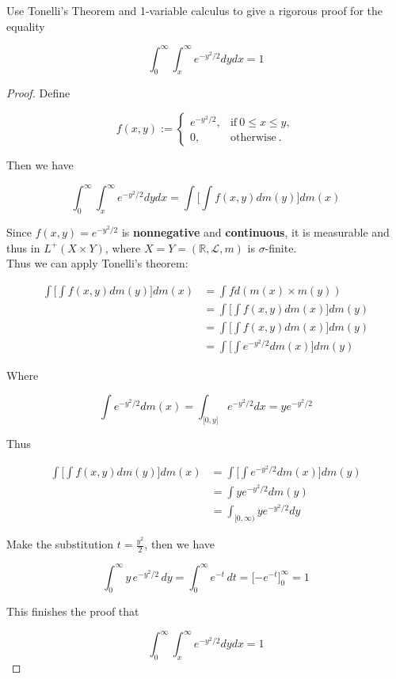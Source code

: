 \documentclass{qlnotes-export}
\begin{document}
Use Tonelli's Theorem and 1-variable calculus to give a rigorous proof for the equality

\[\int_{0}^{\infty}\int_{x}^{\infty}e^{- y^{2}/2} dy dx = 1\]

\begin{proof}

Define

\[f(x,y) := \left\{ \begin{matrix}
{e^{- y^{2}/2},} & {\text{if}\ 0 \leq x \leq y,} \\
{0,} & {\text{otherwise}\ .}
\end{matrix} \right.\]

Then we have

\[\int_{0}^{\infty}\int_{x}^{\infty}e^{- y^{2}/2} dy dx = \int\lbrack\int f(x,y) dm(y)\rbrack dm(x)\]

Since \(f(x,y) = e^{- y^{2}/2}\) is \textbf{nonnegative} and \textbf{continuous}, it is measurable and thus in \(L^{+}(X \times Y)\), where \(X = Y = ({\mathbb{R}},\mathcal{L},m)\) is \(\sigma\)-finite.\\
Thus we can apply Tonelli's theorem:

\[\begin{matrix}
{\int\lbrack\int f(x,y) dm(y)\rbrack dm(x)} & {= \int f d(m(x) \times m(y))} \\
 & {= \int\lbrack\int f(x,y) dm(x)\rbrack dm(y)} \\
 & {= \int\lbrack\int f(x,y) dm(x)\rbrack dm(y)} \\
 & {= \int\lbrack\int e^{- y^{2}/2} dm(x)\rbrack dm(y)}
\end{matrix}\]

Where

\[\int e^{- y^{2}/2} dm(x) = \int_{\lbrack 0,y\rbrack}e^{- y^{2}/2} dx = ye^{- y^{2}/2}\]

Thus

\[\begin{matrix}
{\int\lbrack\int f(x,y) dm(y)\rbrack dm(x)} & {= \int\lbrack\int e^{- y^{2}/2} dm(x)\rbrack dm(y)} \\
 & {= \int ye^{- y^{2}/2} dm(y)} \\
 & {= \int_{\lbrack 0,\infty)}ye^{- y^{2}/2} dy}
\end{matrix}\]

Make the substitution \(t = \frac{y^{2}}{2}\), then we have

\[\int_{0}^{\infty}y\, e^{- y^{2}/2}\, dy = \int_{0}^{\infty}e^{- t}\, dt = \lbrack - e^{- t}\rbrack_{0}^{\infty} = 1\]

This finishes the proof that

\[\int_{0}^{\infty}\int_{x}^{\infty}e^{- y^{2}/2} dy dx = 1\]

\end{proof}
\end{document}
